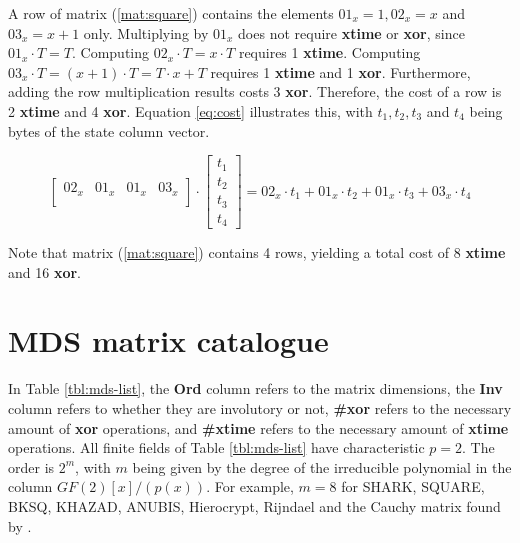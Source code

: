 \documentclass{report}
\begin{document}
A row of matrix (\ref{mat:square}) contains the elements $01_x = 1, 02_x = x$ and $03_x = x + 1$ only. Multiplying by $01_x$ does not require \textbf{xtime} or \textbf{xor}, since $01_x \cdot T = T$. Computing $02_x \cdot T = x \cdot T$ requires 1 \textbf{xtime}. Computing $03_x \cdot T = (x + 1) \cdot T = T \cdot x + T$ requires 1 \textbf{xtime} and 1 \textbf{xor}. Furthermore, adding the row multiplication results costs 3 \textbf{xor}. Therefore, the cost of a row is 2 \textbf{xtime} and 4 \textbf{xor}. Equation \ref{eq:cost} illustrates this, with $t_1, t_2, t_3$ and $t_4$ being bytes of the state column vector.

\begin{equation}\label{eq:cost}
\begin{bmatrix}
02_x & 01_x & 01_x & 03_x\\
\end{bmatrix}
\cdot 
\begin{bmatrix}
t_1\\
t_2\\
t_3\\
t_4
\end{bmatrix}
= 02_x \cdot t_1 + 01_x \cdot t_2 + 01_x \cdot t_3 + 03_x \cdot t_4
\end{equation}

Note that matrix (\ref{mat:square}) contains 4 rows, yielding a total cost of 8 \textbf{xtime} and 16 \textbf{xor}.

\section{MDS matrix catalogue}

In Table \ref{tbl:mds-list}, the \textbf{Ord} column refers to the matrix dimensions, the \textbf{Inv} column refers to whether they are involutory or not, \textbf{\#xor} refers to the necessary amount of \textbf{xor} operations, and \textbf{\#xtime} refers to the necessary amount of \textbf{xtime} operations. All finite fields of Table \ref{tbl:mds-list} have characteristic $p = 2$. The order is $2^m$, with $m$ being given by the degree of the irreducible polynomial in the column $GF(2)[x]/(p(x))$. For example, $m = 8$ for SHARK, SQUARE, BKSQ, KHAZAD, ANUBIS, Hierocrypt, Rijndael and the Cauchy matrix found by \cite{Youssef1997}.
\end{document}
